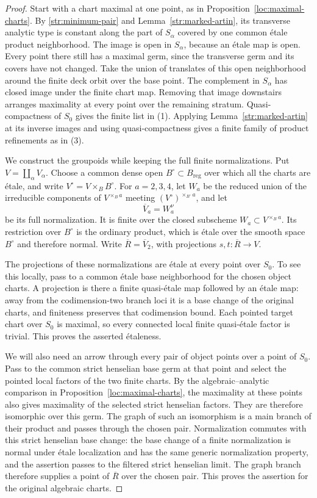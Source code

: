 \begin{proof}
Start with a chart maximal at one point, as in
Proposition~\ref{loc:maximal-charts}.  By
\eqref{str:minimum-pair} and Lemma~\ref{str:marked-artin}, its transverse
analytic type is constant along the part of $S_\alpha$ covered by one
common \'etale product neighborhood.  The image is open in $S_\alpha$,
because an \'etale map is open.  Every point there still has a maximal
germ, since the transverse germ and its covers have not changed.
Take the union of translates of this open neighborhood around the finite
deck orbit over the base point.  The complement in $S_\alpha$ has closed
image under the finite chart map.  Removing that image downstairs
arranges maximality at every point over the remaining stratum.
Quasi-compactness of $S_0$ gives the finite list in (1).  Applying
Lemma~\ref{str:marked-artin} at its inverse images and using
quasi-compactness gives a finite family of product refinements as in (3).

We construct the groupoids while keeping the full finite normalizations.
Put $V=\coprod_\alpha V_\alpha$.  Choose a common dense open
$B^\circ\subset B_{\mathrm{reg}}$ over which all the charts are \'etale,
and write $V^\circ=V\times_BB^\circ$.  For $a=2,3,4$, let $W_a$ be the
reduced union of the irreducible components of $V^{\times_B a}$ meeting
$(V^\circ)^{\times_{B^\circ}a}$, and let
\[
 \overline V_a=W_a^\nu
\]
be its full normalization.  It is finite over the closed subscheme
$W_a\subset V^{\times_Ba}$.  Its restriction over $B^\circ$ is the
ordinary product, which is \'etale over the smooth space $B^\circ$ and
therefore normal.  Write $\overline R=\overline V_2$, with projections
$s,t:\overline R\to V$.

The projections of these normalizations are \'etale at every point
over $S_0$.  To see this locally, pass to a common \'etale base
neighborhood for the chosen object charts.  A projection is there a
finite quasi-\'etale map followed by an \'etale map: away from the
codimension-two branch loci it is a base change of the original charts,
and finiteness preserves that codimension bound.  Each pointed target
chart over $S_0$ is maximal, so every connected local finite
quasi-\'etale factor is trivial.  This proves the asserted \'etaleness.

We will also need an arrow through every pair of object points over a
point of $S_0$.  Pass to the common strict henselian base germ at that
point and select the pointed local factors of the two finite charts.
By the algebraic--analytic comparison in
Proposition~\ref{loc:maximal-charts}, the maximality at these points
also gives maximality of the selected strict henselian factors.
They are therefore isomorphic over this germ.
The graph of such an isomorphism is a main branch of their product and
passes through the chosen pair.  Normalization commutes with this
strict henselian base change: the base change of a finite normalization
is normal under \'etale localization and has the same generic
normalization property, and the assertion passes to the filtered
strict henselian limit.  The graph branch therefore supplies a point
of $\overline R$ over the chosen pair.  This proves the assertion for
the original algebraic charts.


\end{proof}
